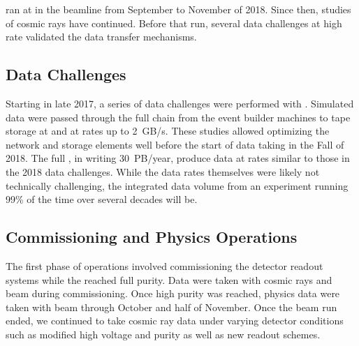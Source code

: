  ran at  in the  beamline from September to November of 2018. Since then, studies of cosmic rays have continued. Before that run, several data challenges at high rate validated the data transfer mechanisms. 

\subsection{Data Challenges}

Starting in late 2017, a series of data challenges were performed with .  Simulated data were passed through the full chain from the event builder machines to tape storage at  and  at rates up to \SI{2}{GB/s}.  These studies allowed optimizing the network and storage elements well before the start of data taking in the Fall of 2018. 
The full  , in writing \SI{30}{PB/year}, produce data at rates similar to  those in the 2018 data challenges. While the data rates themselves were likely not technically challenging, the integrated data volume from an experiment running 99\% of the time over several decades will be. 

\subsection{Commissioning and Physics Operations}

The first phase of operations involved commissioning the detector readout systems while the  reached full purity.  Data were taken with cosmic rays and beam during commissioning. Once high  purity was reached, physics data were  taken with beam through October and half of November. %
Once the beam run ended, we continued to take cosmic ray data under varying detector conditions such as modified high voltage and purity as well as new readout schemes. 


